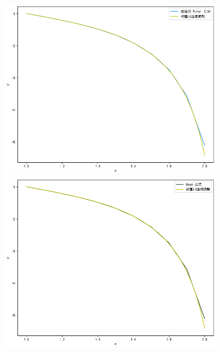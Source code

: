 \documentclass[UTF8,ctexart,a4paper,11pt,openany]{article}
\theoremstyle{definition}
\begin{document}
        \begin{figure}[H]
            \begin{minipage}{0.42\textwidth}
                \centering
                \includegraphics[width=\linewidth]{pics/P9.2.png}
            \end{minipage}%
            \hspace{2cm}
            \begin{minipage}{0.42\textwidth}
                \centering
                \includegraphics[width=\linewidth]{pics/P9.3.png}
            \end{minipage}%

\end{figure}
\end{document}
